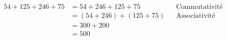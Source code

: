 %
%
    \begin{align*}
        54 + 125 + 246 + 75
         & = 54 + 246 + 125 + 75     &  & \text{Commutativité} \\
         & = (54 + 246) + (125 + 75) &  & \text{Associativité} \\
         & = 300 + 200                                         \\
         & = 500                                               \\
    \end{align*}
